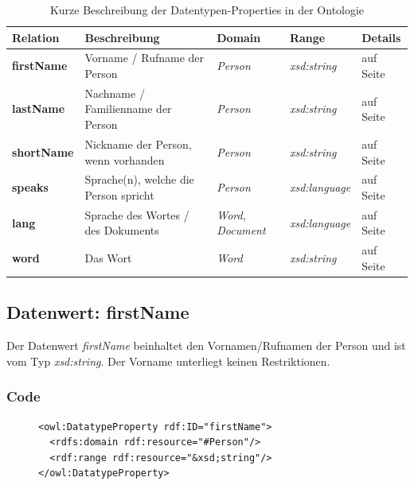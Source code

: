 \documentclass[
    11pt,
    latin1,
    a4paper,
    oneside
]{scrreprt}
\begin{document}
\begin{table}[H]
  \centering
  \begin{tabular}{ | l | p{4cm} | p{3cm} | p{2cm} | p{2cm} | }
    \hline
    \textbf{Relation} & \textbf{Beschreibung} & \textbf{Domain} & \textbf{Range} & \textbf{Details} \\ \hline
    \textbf{firstName} & Vorname / Rufname der Person & \emph{Person} & \emph{xsd:string} & \nameref{sec:data_firstname} auf Seite \pageref{sec:data_firstname} \\ \hline
    \textbf{lastName} & Nachname / Familienname der Person & \emph{Person} & \emph{xsd:string} & \nameref{sec:data_lastname} auf Seite \pageref{sec:data_lastname} \\ \hline
    \textbf{shortName} & Nickname der Person, wenn vorhanden & \emph{Person} & \emph{xsd:string} & \nameref{sec:data_nickname} auf Seite \pageref{sec:data_nickname} \\ \hline
    \textbf{speaks} & Sprache(n), welche die Person spricht & \emph{Person} & \emph{xsd:language} & \nameref{sec:data_speaks} auf Seite \pageref{sec:data_speaks} \\ \hline
    \textbf{lang} & Sprache des Wortes / des Dokuments & \emph{Word}, \emph{Document} & \emph{xsd:language} & \nameref{sec:data_lang} auf Seite \pageref{sec:data_lang} \\ \hline
    \textbf{word} & Das Wort & \emph{Word} & \emph{xsd:string} & \nameref{sec:data_word} auf Seite \pageref{sec:data_word} \\ \hline
  \end{tabular}
  \caption{Kurze Beschreibung der Datentypen-Properties in der Ontologie}
  \label{tbl:datatypes}
\end{table}


\subsection{Datenwert: firstName} \label{sec:data_firstname}

Der Datenwert \emph{firstName} beinhaltet den Vornamen/Rufnamen der Person und ist vom Typ \emph{xsd:string}. Der Vorname unterliegt keinen Restriktionen.

\subsubsection{Code} \label{sec:data_firstname_code}

\begin{figure}[H]
 \lstset{language=XML}
 \begin{lstlisting}[label=owl:firstname,caption={Der Datenwert \emph{firstName} gibt den Vornamen einer Person an.}]
<owl:DatatypeProperty rdf:ID="firstName">
  <rdfs:domain rdf:resource="#Person"/>
  <rdf:range rdf:resource="&xsd;string"/>
</owl:DatatypeProperty>
 \end{lstlisting}
\end{figure}
\end{document}
